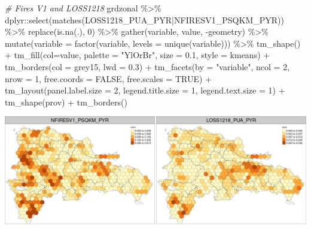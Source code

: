 \documentclass[10pt,landscape,a3paper]{article}
\newenvironment{Shaded}{\begin{snugshade}}{\end{snugshade}}
\newcommand{\AttributeTok}[1]{\textcolor[rgb]{0.77,0.63,0.00}{#1}}
\newcommand{\CommentTok}[1]{\textcolor[rgb]{0.56,0.35,0.01}{\textit{#1}}}
\newcommand{\ConstantTok}[1]{\textcolor[rgb]{0.00,0.00,0.00}{#1}}
\newcommand{\DecValTok}[1]{\textcolor[rgb]{0.00,0.00,0.81}{#1}}
\newcommand{\FloatTok}[1]{\textcolor[rgb]{0.00,0.00,0.81}{#1}}
\newcommand{\FunctionTok}[1]{\textcolor[rgb]{0.00,0.00,0.00}{#1}}
\newcommand{\NormalTok}[1]{#1}
\newcommand{\SpecialCharTok}[1]{\textcolor[rgb]{0.00,0.00,0.00}{#1}}
\newcommand{\StringTok}[1]{\textcolor[rgb]{0.31,0.60,0.02}{#1}}
\begin{document}
\begin{Shaded}
\begin{Highlighting}[]

\CommentTok{\# Fires V1 and LOSS1218}
\NormalTok{grdzonal }\SpecialCharTok{\%\textgreater{}\%}\NormalTok{ dplyr}\SpecialCharTok{::}\FunctionTok{select}\NormalTok{(}\FunctionTok{matches}\NormalTok{(}\StringTok{\textquotesingle{}LOSS1218\_PUA\_PYR|NFIRESV1\_PSQKM\_PYR\textquotesingle{}}\NormalTok{)) }\SpecialCharTok{\%\textgreater{}\%} 
  \FunctionTok{replace}\NormalTok{(}\FunctionTok{is.na}\NormalTok{(.), }\DecValTok{0}\NormalTok{) }\SpecialCharTok{\%\textgreater{}\%} 
  \FunctionTok{gather}\NormalTok{(variable, value, }\SpecialCharTok{{-}}\NormalTok{geometry) }\SpecialCharTok{\%\textgreater{}\%}
  \FunctionTok{mutate}\NormalTok{(}\AttributeTok{variable =} \FunctionTok{factor}\NormalTok{(variable, }\AttributeTok{levels =} \FunctionTok{unique}\NormalTok{(variable))) }\SpecialCharTok{\%\textgreater{}\%} 
  \FunctionTok{tm\_shape}\NormalTok{() }\SpecialCharTok{+}
  \FunctionTok{tm\_fill}\NormalTok{(}\AttributeTok{col=}\StringTok{\textquotesingle{}value\textquotesingle{}}\NormalTok{, }\AttributeTok{palette =} \StringTok{"YlOrBr"}\NormalTok{, }\AttributeTok{size =} \FloatTok{0.1}\NormalTok{, }\AttributeTok{style =} \StringTok{\textquotesingle{}kmeans\textquotesingle{}}\NormalTok{) }\SpecialCharTok{+}
  \FunctionTok{tm\_borders}\NormalTok{(}\AttributeTok{col =} \StringTok{\textquotesingle{}grey15\textquotesingle{}}\NormalTok{, }\AttributeTok{lwd =} \FloatTok{0.3}\NormalTok{) }\SpecialCharTok{+}
  \FunctionTok{tm\_facets}\NormalTok{(}\AttributeTok{by =} \StringTok{"variable"}\NormalTok{, }\AttributeTok{ncol =} \DecValTok{2}\NormalTok{, }\AttributeTok{nrow =} \DecValTok{1}\NormalTok{, }\AttributeTok{free.coords =} \ConstantTok{FALSE}\NormalTok{, }\AttributeTok{free.scales =} \ConstantTok{TRUE}\NormalTok{) }\SpecialCharTok{+}
  \FunctionTok{tm\_layout}\NormalTok{(}\AttributeTok{panel.label.size =} \DecValTok{2}\NormalTok{, }\AttributeTok{legend.title.size =} \DecValTok{1}\NormalTok{, }\AttributeTok{legend.text.size =} \DecValTok{1}\NormalTok{) }\SpecialCharTok{+}
  \FunctionTok{tm\_shape}\NormalTok{(prov) }\SpecialCharTok{+} \FunctionTok{tm\_borders}\NormalTok{()}
\end{Highlighting}
\end{Shaded}

\begin{center}\includegraphics{img/zonal-long-term-grid-14} \end{center}
\end{document}
